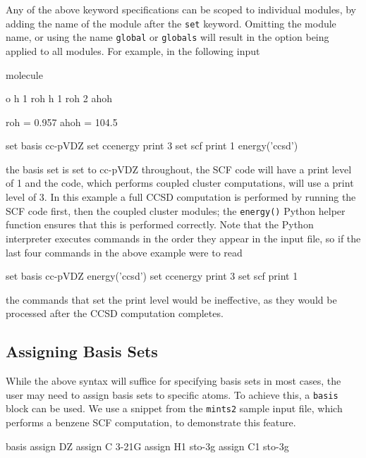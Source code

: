 Any of the above keyword specifications can be scoped to individual modules,
by adding the name of the module after the {\tt set} keyword. Omitting the module
name, or using the name {\tt global} or {\tt globals} will result in the option being
applied to all modules. For example, in the following input
\begin{Snippet}
molecule{
  o
  h 1 roh
  h 1 roh 2 ahoh

  roh = 0.957
  ahoh = 104.5
}

set basis cc-pVDZ
set ccenergy print 3
set scf print 1
energy('ccsd')
\end{Snippet}
the basis set is set to cc-pVDZ throughout, the SCF code will have a print
level of 1 and the \PSIccenergy code, which performs coupled cluster computations,
will use a print level of 3. In this example a full CCSD computation is
performed by running the SCF code first, then the coupled cluster modules;
the {\tt energy()} Python helper function ensures that this is performed correctly.
Note that the Python interpreter executes commands in the order they appear in
the input file, so if the last four commands in the above example were to read
\begin{Snippet}
set basis cc-pVDZ
energy('ccsd')
set ccenergy print 3
set scf print 1
\end{Snippet}
the commands that set the print level would be ineffective, as they would be
processed after the CCSD computation completes. 


\subsection{Assigning Basis Sets}
While the above syntax will suffice for specifying basis sets in most cases,
the user may need to assign basis sets to specific atoms.  To achieve this, a
{\tt basis} block can be used.  We use a snippet from the {\tt mints2} sample
input file, which performs a benzene SCF computation, to demonstrate this
feature.

\begin{Snippet}
basis {
   assign DZ
   assign C 3-21G
   assign H1 sto-3g
   assign C1 sto-3g
}
\end{Snippet}

